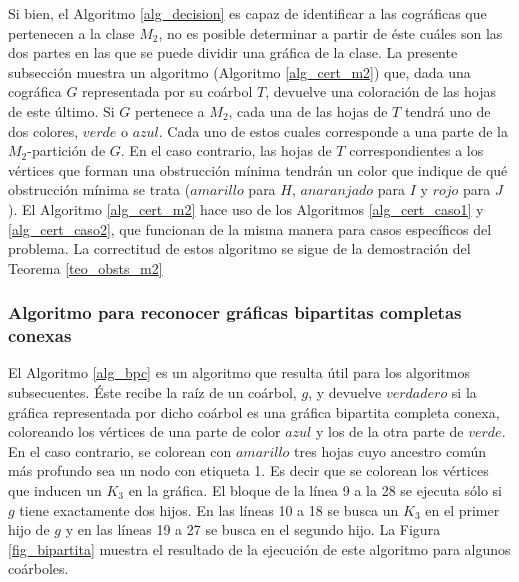 Si bien, el Algoritmo \ref{alg_decision} es capaz de identificar a las cográficas que pertenecen a la clase $M_2$, no es posible determinar a partir de éste cuáles son las dos partes en las que se puede dividir una gráfica de la clase. La presente subsección muestra un algoritmo (Algoritmo \ref{alg_cert_m2}) que, dada una cográfica $G$ representada por su coárbol $T$, devuelve una coloración de las hojas de este último. Si $G$ pertenece a $M_2$, cada una de las hojas de $T$ tendrá uno de dos colores, $verde$ o $azul$. Cada uno de estos cuales corresponde a una parte de la $M_2$-partición de $G$. En el caso contrario, las hojas de $T$ correspondientes a los vértices que forman una obstrucción mínima tendrán un color que indique de qué obstrucción mínima se trata ($amarillo$ para $H$, $anaranjado$ para $I$ y $rojo$ para $J$). El Algoritmo \ref{alg_cert_m2} hace uso de los Algoritmos \ref{alg_cert_caso1} y \ref{alg_cert_caso2}, que funcionan de la misma manera para casos específicos del problema. La correctitud de estos algoritmo se sigue de la demostración del Teorema \ref{teo_obsts_m2}

\subsubsection{Algoritmo para reconocer gráficas bipartitas completas conexas}

El Algoritmo \ref{alg_bpc} es un algoritmo que resulta útil para los algoritmos subsecuentes. Éste recibe la raíz de un coárbol, $g$, y devuelve $verdadero$ si la gráfica representada por dicho coárbol es una gráfica bipartita completa conexa, coloreando los vértices de una parte de color $azul$ y los de la otra parte de $verde$. En el caso contrario, se colorean con $amarillo$  tres hojas cuyo ancestro común más profundo sea un nodo con etiqueta 1. Es decir que se colorean los vértices que inducen un $K_3$ en la gráfica. El bloque de la línea 9 a la 28 se ejecuta sólo si $g$ tiene exactamente dos hijos. En las líneas 10 a 18 se busca un $K_3$ en el primer hijo de $g$ y en las líneas 19 a 27 se busca en el segundo hijo. La Figura \ref{fig_bipartita} muestra el resultado de la ejecución de este algoritmo para algunos coárboles.

